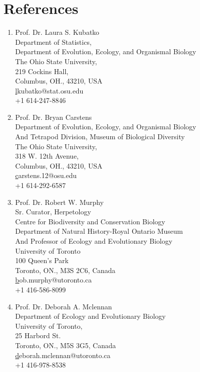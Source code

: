 \documentclass[11pt]{article}
\begin{document}
\section*{References}

\begin{enumerate}

\item Prof. Dr. Laura S. Kubatko\\Department of Statistics,\\Department of Evolution, Ecology, and Organismal Biology\\The Ohio State University,\\219 Cockins Hall,\\Columbus, OH., 43210, USA\\\href{lkubatko@stat.osu.edu}lkubatko@stat.osu.edu\\+1 614-247-8846\\

\item Prof. Dr. Bryan Carstens\\ Department of Evolution, Ecology, and Organismal Biology\\ And Tetrapod Division, Museum of Biological Diversity\\The Ohio State University,\\318 W. 12th Avenue,\\Columbus, OH., 43210, USA\\\href{carstens.12@osu.edu}carstens.12@osu.edu\\+1 614-292-6587\\

\item Prof. Dr. Robert W. Murphy\\Sr. Curator, Herpetology\\Centre for Biodiversity and Conservation Biology\\Department of Natural History-Royal Ontario Museum\\And Professor of Ecology and Evolutionary Biology\\ University of Toronto\\100 Queen’s Park\\Toronto, ON., M3S 2C6, Canada\\\href{bob.murphy@utoronto.ca}bob.murphy@utoronto.ca\\+1 416-586-8099

\item Prof. Dr. Deborah A. Mclennan\\Department of Ecology and Evolutionary Biology\\University of Toronto,\\25 Harbord St.\\Toronto, ON., M5S 3G5, Canada \\\href{deborah.mclennan@utoronto.ca}deborah.mclennan@utoronto.ca\\+1 416-978-8538
\end{enumerate}
\end{document}
